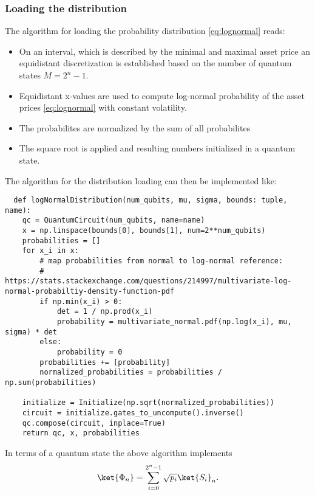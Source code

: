 \documentclass[../../main.tex]{subfiles}
\begin{document}
\subsubsection{Loading the distribution}\label{sec:loadingDist}
The algorithm for loading the probability distribution \ref{eq:lognormal} reads:
\begin{itemize}
  \item On an interval, which is described by the minimal and maximal asset price an equidistant discretization is established
   based on the number of quantum states $M=2^n-1$.
  \item Equidistant x-values are used to compute log-normal probability of the asset prices \ref{eq:lognormal} with constant volatility.
  \item The probabilites are normalized by the sum of all probabilites
  \item The square root is applied and resulting numbers initialized in a quantum state.
\end{itemize} 
The algorithm for the distribution loading can then be implemented like:
\begin{lstlisting}
  def logNormalDistribution(num_qubits, mu, sigma, bounds: tuple, name):
    qc = QuantumCircuit(num_qubits, name=name)
    x = np.linspace(bounds[0], bounds[1], num=2**num_qubits)
    probabilities = []
    for x_i in x:
        # map probabilities from normal to log-normal reference:
        # https://stats.stackexchange.com/questions/214997/multivariate-log-normal-probabiltiy-density-function-pdf
        if np.min(x_i) > 0:
            det = 1 / np.prod(x_i)
            probability = multivariate_normal.pdf(np.log(x_i), mu, sigma) * det
        else:
            probability = 0
        probabilities += [probability]
        normalized_probabilities = probabilities / np.sum(probabilities) 
        
    initialize = Initialize(np.sqrt(normalized_probabilities))
    circuit = initialize.gates_to_uncompute().inverse()
    qc.compose(circuit, inplace=True)
    return qc, x, probabilities
\end{lstlisting}
In terms of a quantum state the above algorithm implements
\begin{equation}\label{eq:distLoading}
\ket{{\Phi}_n} = \sum_{i=0}^{2^n-1} \sqrt{p_i} \ket{S_i}_n .
\end{equation}
\end{document}
